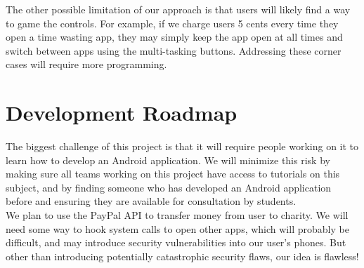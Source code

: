 \documentclass[12pt]{article}
\begin{document}
The other possible limitation of our approach is that users will likely find a way to game the controls. For example, if we charge users 5 cents every time they open a time wasting app, they may simply keep the app open at all times and switch between apps using the multi-tasking buttons. Addressing these corner cases will require more programming. \\

\section{Development Roadmap}
The biggest challenge of this project is that it will require people working on it to learn how to develop an Android application. We will minimize this risk by making sure all teams working on this project have access to tutorials on this subject, and by finding someone who has developed an Android application before and ensuring they are available for consultation by students. \\


We plan to use the PayPal API to transfer money from user to charity. We will need some way to hook system calls to open other apps, which will probably be difficult, and may introduce security vulnerabilities into our user’s phones. But other than introducing potentially catastrophic security flaws, our idea is flawless! \\



\end{document}
